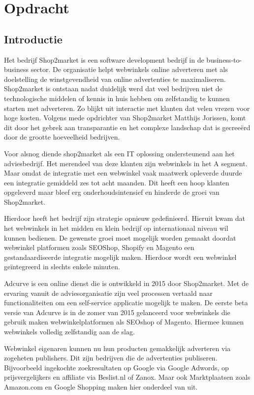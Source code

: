 \chapter{Opdracht}

\section{Introductie}

Het bedrijf Shop2market is een software development bedrijf in de business-to-business sector. De organisatie helpt webwinkels online adverteren met als doelstelling de winstgevendheid van online advertenties te maximaliseren. Shop2market is ontstaan nadat duidelijk werd dat veel bedrijven niet de technologische middelen of kennis in huis hebben om zelfstandig te kunnen starten met adverteren. Zo blijkt uit interactie met klanten dat velen vrezen voor hoge kosten. Volgens mede opdrichter van Shop2market Matthijs Jorissen, komt dit door het gebrek aan transparantie en het complexe landschap dat is gecreeërd door de grootte hoeveelheid bedrijven.

Voor alsnog diende shop2market als een IT oplossing ondersteunend aan het adviesbedrijf. Het merendeel van deze klanten zijn webwinkels in het A segment. Maar omdat de integratie met een webwinkel vaak maatwerk opleverde duurde een integratie gemiddeld zes tot acht maanden. Dit heeft een hoop klanten opgeleverd maar bleef erg onderhoudsintensief en hinderde de groei van Shop2market.

Hierdoor heeft het bedrijf zijn strategie opnieuw gedefinieerd. Hieruit kwam dat het webwinkels in het midden en klein bedrijf op internationaal niveau wil kunnen bedienen. De gewenste groei moet mogelijk worden gemaakt doordat webwinkel platformen zoals SEOShop, Shopify en Magento een gestandaardiseerde integratie mogelijk maken. Hierdoor wordt een webwinkel geïntegreerd in slechts enkele minuten.

Adcurve is een online dienst die is ontwikkeld in 2015 door Shop2market. Met de ervaring vanuit de adviesorganisatie zijn veel processen vertaald naar functionaliteiten om een self-service applicatie mogelijk te maken. De eerste beta versie van Adcurve is in de zomer van 2015 gelanceerd voor webwinkels die gebruik maken webwinkelplatformen als SEOshop of Magento. Hiermee kunnen webwinkels volledig zelfstandig aan de slag.

Webwinkel eigenaren kunnen nu hun producten gemakkelijk adverteren via zogeheten publishers. Dit zijn bedrijven die de advertenties publiseren. Bijvoorbeeld ingekochte zoekresultaten op Google via Google Adwords, op prijsvergelijkers en affiliate via Beslist.nl of Zanox. Maar ook Marktplaatsen zoals Amazon.com en Google Shopping maken hier onderdeel van uit.

